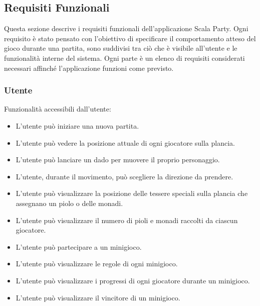 \subsection{Requisiti Funzionali} \label{sec:functional-requirements}
Questa sezione descrive i requisiti funzionali dell'applicazione Scala Party.
Ogni requisito è stato pensato con l'obiettivo di specificare il comportamento atteso
del gioco durante una partita, sono suddivisi tra ciò che è visibile all'utente e
le funzionalità interne del sistema. Ogni parte è un elenco di requisiti considerati
necessari affinché l'applicazione funzioni come previsto.

\subsubsection{Utente} \label{sec:functional-requirements:user}
Funzionalità accessibili dall'utente:
\begin{itemize}
    \item L'utente può iniziare una nuova partita.
    \item L'utente può vedere la posizione attuale di ogni giocatore sulla plancia.
    \item L'utente può lanciare un dado per muovere il proprio personaggio.
    \item L'utente, durante il movimento, può scegliere la direzione da prendere.
    \item L'utente può visualizzare la posizione delle tessere speciali sulla plancia che
          assegnano un piolo o delle monadi.
    \item L'utente può visualizzare il numero di pioli e monadi raccolti da ciascun giocatore.
    \item L'utente può partecipare a un minigioco.
    \item L'utente può visualizzare le regole di ogni minigioco.
    \item L'utente può visualizzare i progressi di ogni giocatore durante un minigioco.
    \item L'utente può visualizzare il vincitore di un minigioco.
\end{itemize}

